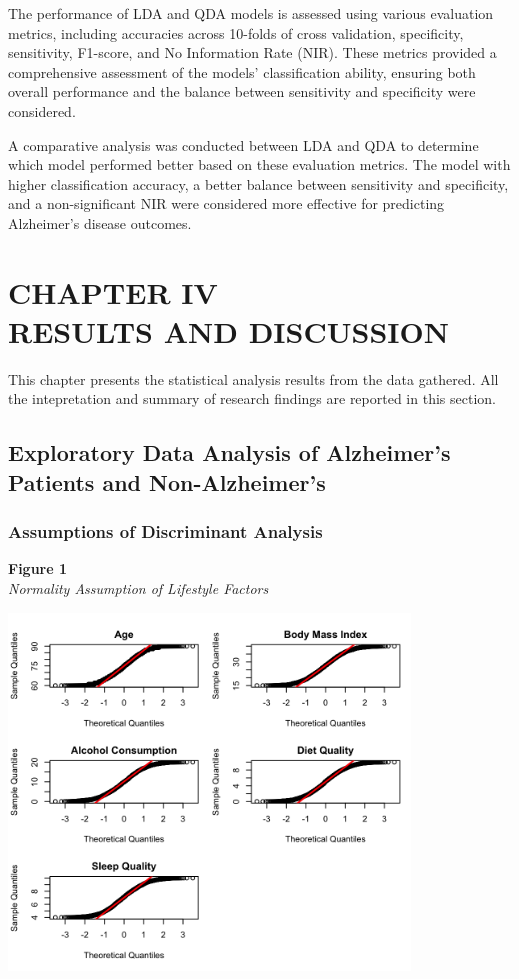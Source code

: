 \documentclass[12pt]{article}
\begin{document}
The performance of LDA and QDA models is assessed using various evaluation metrics, including accuracies across 10-folds of cross validation, specificity, sensitivity, F1-score, and No Information Rate (NIR). These metrics provided a comprehensive assessment of the models' 
classification ability, ensuring both overall performance and the balance between sensitivity and specificity were considered.

A comparative analysis was conducted between LDA and QDA to determine which model performed better based on these evaluation metrics. The model with higher classification accuracy, a better balance between sensitivity and specificity, and a non-significant NIR were considered 
more effective for predicting Alzheimer’s disease outcomes.

\newpage
\section{CHAPTER IV \\ RESULTS AND DISCUSSION}
\noindent

This chapter presents the statistical analysis results from the data gathered. All the intepretation and summary of research findings are reported in this section. 

\subsection{Exploratory Data Analysis of Alzheimer's Patients and Non-Alzheimer's}
\subsubsection{Assumptions of Discriminant Analysis}
\textbf{Figure 1}\\
\textit{Normality Assumption of Lifestyle Factors}
\begin{center}
    \includegraphics[width = 0.8\textwidth]{QQ_Lifestyle.png}
\end{center}
\end{document}
